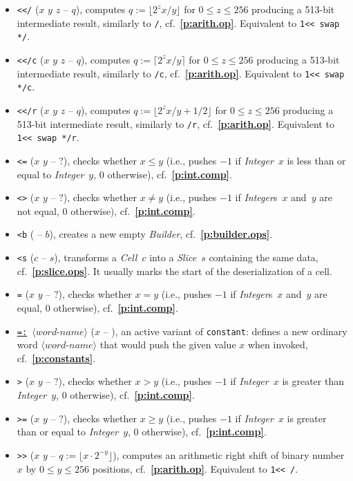 \documentclass[12pt,oneside]{article}
\def\refpoint#1{{\rm\textbf{\ref{#1}}}}
\let\ptref=\refpoint
\begin{document}
\begin{itemize}
\item {\tt <{}</} ($x$ $y$ $z$ -- $q$), computes $q:=\lfloor 2^zx/y\rfloor$ for $0\leq z\leq 256$ producing a 513-bit intermediate result, similarly to {\tt */}, cf.~\ptref{p:arith.op}. Equivalent to {\tt 1<{}< swap */}.
\item {\tt <{}</c} ($x$ $y$ $z$ -- $q$), computes $q:=\lceil 2^zx/y\rceil$ for $0\leq z\leq 256$ producing a 513-bit intermediate result, similarly to {\tt */c}, cf.~\ptref{p:arith.op}. Equivalent to {\tt 1<{}< swap */c}.
\item {\tt <{}</r} ($x$ $y$ $z$ -- $q$), computes $q:=\lfloor 2^zx/y+1/2\rfloor$ for $0\leq z\leq 256$ producing a 513-bit intermediate result, similarly to {\tt */r}, cf.~\ptref{p:arith.op}. Equivalent to {\tt 1<{}< swap */r}.
\item {\tt <=} ($x$ $y$ -- $?$), checks whether $x\leq y$ (i.e., pushes $-1$ if {\em Integer\/}~$x$ is less than or equal to {\em Integer\/}~$y$, $0$ otherwise), cf.~\ptref{p:int.comp}.
\item {\tt <>} ($x$ $y$ -- $?$), checks whether $x\neq y$ (i.e., pushes $-1$ if {\em Integer\/}s~$x$ and~$y$ are not equal, $0$ otherwise), cf.~\ptref{p:int.comp}.
\item {\tt <b} ( -- $b$), creates a new empty {\em Builder}, cf.~\ptref{p:builder.ops}.
\item {\tt <s} ($c$ -- $s$), transforms a {\em Cell\/}~$c$ into a {\em Slice\/}~$s$ containing the same data, cf.~\ptref{p:slice.ops}. It usually marks the start of the deserialization of a cell.
\item {\tt =} ($x$ $y$ -- $?$), checks whether $x=y$ (i.e., pushes $-1$ if {\em Integer\/}s~$x$ and~$y$ are equal, $0$ otherwise), cf.~\ptref{p:int.comp}.
\item {\tt \underline{=:} $\langle\textit{word-name}\rangle$} ($x$ -- ), an active variant of {\tt constant}: defines a new ordinary word $\langle\textit{word-name}\rangle$ that would push the given value $x$ when invoked, cf.~\ptref{p:constants}.
\item {\tt >} ($x$ $y$ -- $?$), checks whether $x>y$ (i.e., pushes $-1$ if {\em Integer\/}~$x$ is greater than {\em Integer\/}~$y$, $0$ otherwise), cf.~\ptref{p:int.comp}.
\item {\tt >=} ($x$ $y$ -- $?$), checks whether $x\geq y$ (i.e., pushes $-1$ if {\em Integer\/}~$x$ is greater than or equal to {\em Integer\/}~$y$, $0$ otherwise), cf.~\ptref{p:int.comp}.
\item {\tt >{}>} ($x$ $y$ -- $q:=\lfloor x\cdot 2^{-y}\rfloor$), computes an arithmetic right shift of binary number $x$ by $0\leq y\leq 256$ positions, cf.~\ptref{p:arith.op}. Equivalent to {\tt 1<{}< /}.

\end{itemize}
\end{document}
